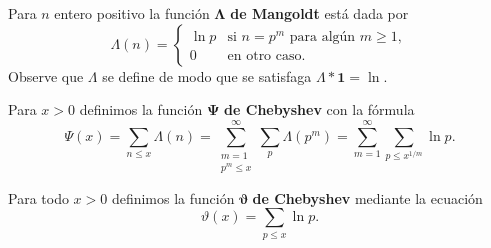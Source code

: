 Para \(n\) entero positivo la funci\'on
\(\boldsymbol{\Lambda}\) \textbf{de Mangoldt} est\'a dada por 
\[
  \Lambda(n) =
  \begin{cases}
    \ln p &\text{si } n = p^m \text{ para alg\'un } m \geq 1,\\
    0 &\text{en otro caso.}
  \end{cases}
\]
Observe que \(\Lambda\) se define de modo que se satisfaga
\(\Lambda * \textbf{1} = \ln\).

Para \(x > 0\) definimos la funci\'on
\(\boldsymbol{\Psi}\) \textbf{de Chebyshev} con la f\'ormula
\[
  \Psi(x)
  = \sum_{n \leq x} \Lambda(n) 
  = \sum_{\substack{m = 1\\p^m \leq x}}^\infty \sum_p \Lambda(p^m)
  = \sum_{m = 1}^\infty \sum_{p \leq x^{1/m}} \ln p.
\]

Para todo \(x > 0\) definimos la funci\'on \(\boldsymbol{\vartheta}\)
\textbf{de Chebyshev} mediante la ecuaci\'on
\[
  \vartheta(x) = \sum_{p \leq x} \ln p.
\]

